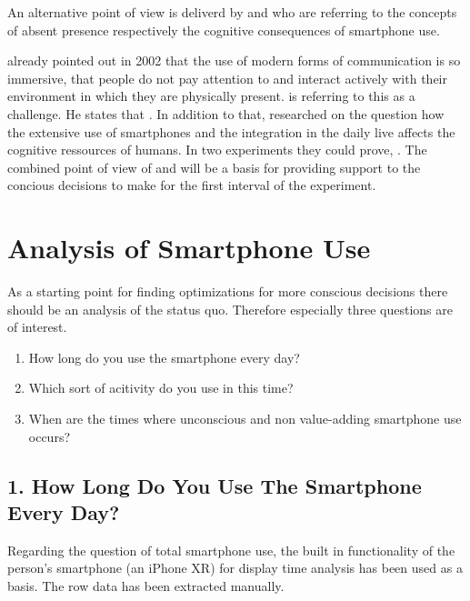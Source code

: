 \documentclass[11pt,letterpaper]{article}
\begin{document}
An alternative point of view is deliverd by \cite{gergen02} and \cite{ward17} who are referring to the concepts of absent presence respectively the cognitive consequences of smartphone use.
\begin{center}
 \autocite[][p.227]{gergen02}
\end{center}
\cite{gergen02} already pointed out in 2002 that the use of modern forms of communication is so immersive, that people do not pay attention to and interact actively with their environment in which they are physically present. \cite{gergen02} is referring to this as a challenge. He states that \autocite[][p.236]{gergen02}. In addition to that, \cite{ward17} researched on the question how the extensive use of smartphones and the integration in the daily live affects the cognitive ressources of humans. In two experiments they could prove,  \autocite[][]{ward17}. The combined point of view of \cite{gergen02} and \cite{ward17} will be a basis for providing support to the concious decisions to make for the first interval of the experiment.


\section*{Analysis of Smartphone Use}
As a starting point for finding optimizations for more conscious decisions there should be an analysis of the status quo. Therefore especially three questions are of interest. 
\begin{enumerate}
\item How long do you use the smartphone every day?
\item Which sort of acitivity do you use in this time?
\item When are the times where unconscious and non value-adding smartphone use occurs?
\end{enumerate}

\subsection*{1. How Long Do You Use The Smartphone Every Day?}
Regarding the question of total smartphone use, the built in functionality of the person's smartphone (an iPhone XR) for display time analysis has been used as a basis. The row data has been extracted manually. 
\end{document}
